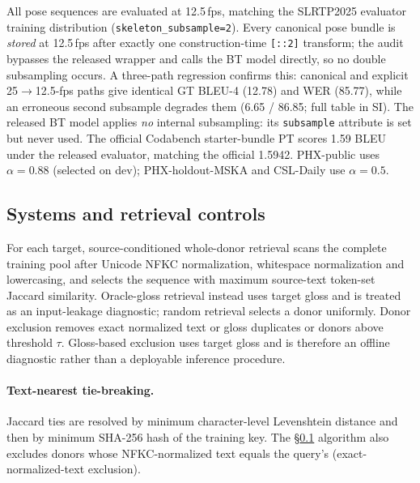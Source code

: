 \documentclass[pdflatex,sn-chicago]{sn-jnl}
\begin{document}
All pose sequences are evaluated at 12.5\,fps, matching the SLRTP2025 evaluator training distribution (\texttt{skeleton\_subsample=2}). Every canonical pose bundle is \emph{stored} at 12.5\,fps after exactly one construction-time \texttt{[::2]} transform; the audit bypasses the released wrapper and calls the BT model directly, so no double subsampling occurs. A three-path regression confirms this: canonical and explicit 25$\to$12.5-fps paths give identical GT BLEU-4 (12.78) and WER (85.77), while an erroneous second subsample degrades them (6.65 / 86.85; full table in SI). The released BT model applies \emph{no} internal subsampling: its \texttt{subsample} attribute is set but never used. The official Codabench starter-bundle PT scores 1.59 BLEU under the released evaluator, matching the official 1.5942. PHX-public uses $\alpha{=}0.88$ (selected on dev); PHX-holdout-MSKA and CSL-Daily use $\alpha{=}0.5$.

\subsection{Systems and retrieval controls}
\label{sec:retrieval}
For each target, source-conditioned whole-donor retrieval scans the complete training pool after Unicode NFKC normalization, whitespace normalization and lowercasing, and selects the sequence with maximum source-text token-set Jaccard similarity. Oracle-gloss retrieval instead uses target gloss and is treated as an input-leakage diagnostic; random retrieval selects a donor uniformly. Donor exclusion removes exact normalized text or gloss duplicates or donors above threshold $\tau$. Gloss-based exclusion uses target gloss and is therefore an offline diagnostic rather than a deployable inference procedure.

\paragraph{Text-nearest tie-breaking.}
\label{sec:method_tie_breaking}
Jaccard ties are resolved by minimum character-level Levenshtein distance and then by minimum SHA-256 hash of the training key. The \S\ref{sec:retrieval} algorithm also excludes donors whose NFKC-normalized text equals the query's (exact-normalized-text exclusion).
\end{document}
